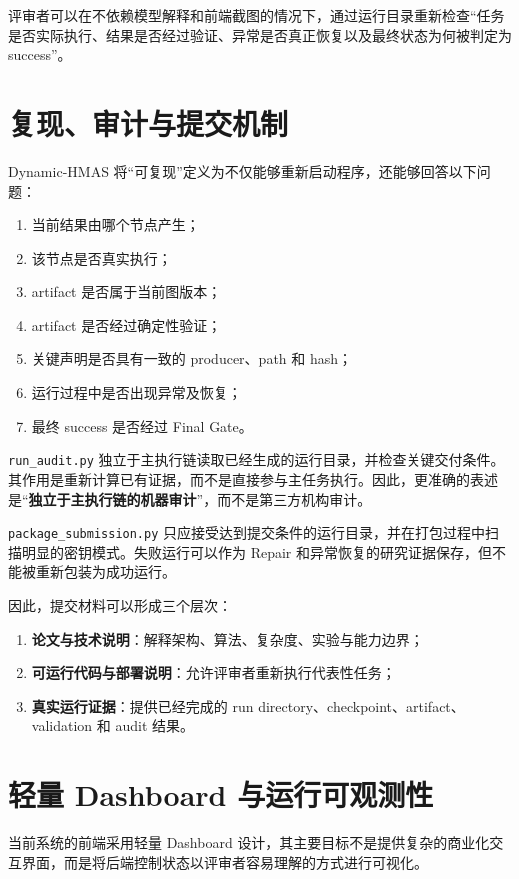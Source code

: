 \documentclass[UTF8,a4paper,12pt,oneside]{ctexbook}
\begin{document}
评审者可以在不依赖模型解释和前端截图的情况下，通过运行目录重新检查“任务是否实际执行、结果是否经过验证、异常是否真正恢复以及最终状态为何被判定为 success”。


\section{复现、审计与提交机制}

Dynamic-HMAS 将“可复现”定义为不仅能够重新启动程序，还能够回答以下问题：

\begin{enumerate}
    \item 当前结果由哪个节点产生；
    \item 该节点是否真实执行；
    \item artifact 是否属于当前图版本；
    \item artifact 是否经过确定性验证；
    \item 关键声明是否具有一致的 producer、path 和 hash；
    \item 运行过程中是否出现异常及恢复；
    \item 最终 success 是否经过 Final Gate。
\end{enumerate}

\texttt{run\_audit.py} 独立于主执行链读取已经生成的运行目录，并检查关键交付条件。其作用是重新计算已有证据，而不是直接参与主任务执行。因此，更准确的表述是“\textbf{独立于主执行链的机器审计}”，而不是第三方机构审计。

\texttt{package\_submission.py} 只应接受达到提交条件的运行目录，并在打包过程中扫描明显的密钥模式。失败运行可以作为 Repair 和异常恢复的研究证据保存，但不能被重新包装为成功运行。

因此，提交材料可以形成三个层次：

\begin{enumerate}
    \item \textbf{论文与技术说明}：解释架构、算法、复杂度、实验与能力边界；
    \item \textbf{可运行代码与部署说明}：允许评审者重新执行代表性任务；
    \item \textbf{真实运行证据}：提供已经完成的 run directory、checkpoint、artifact、validation 和 audit 结果。
\end{enumerate}


\section{轻量 Dashboard 与运行可观测性}

当前系统的前端采用轻量 Dashboard 设计，其主要目标不是提供复杂的商业化交互界面，而是将后端控制状态以评审者容易理解的方式进行可视化。
\end{document}
